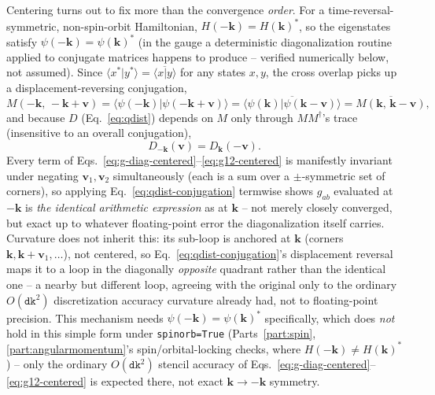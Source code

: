 \documentclass[11pt]{article}
\begin{document}
Centering turns out to fix more than the convergence \emph{order}. For a
time-reversal-symmetric, non-spin-orbit Hamiltonian, $H(-\mathbf k)=H(\mathbf k)^*$, so
the eigenstates satisfy $\psi(-\mathbf k) = \psi(\mathbf k)^*$ (in the gauge a
deterministic diagonalization routine applied to conjugate matrices happens to produce --
verified numerically below, not assumed). Since $\langle x^*|y^*\rangle =
\overline{\langle x|y\rangle}$ for any states $x,y$, the cross overlap picks up a
displacement-reversing conjugation,
\begin{equation}
  M(-\mathbf k,\, -\mathbf k+\mathbf v) = \langle\psi(-\mathbf k)|\psi(-\mathbf k+\mathbf v)\rangle
  = \overline{\langle\psi(\mathbf k)|\psi(\mathbf k-\mathbf v)\rangle}
  = \overline{M(\mathbf k,\,\mathbf k-\mathbf v)},
\end{equation}
and because $D$ (Eq.~\eqref{eq:qdist}) depends on $M$ only through $MM^\dagger$'s trace
(insensitive to an overall conjugation),
\begin{equation}
  D_{-\mathbf k}(\mathbf v) = D_{\mathbf k}(-\mathbf v).
  \label{eq:qdist-conjugation}
\end{equation}
Every term of Eqs.~\eqref{eq:g-diag-centered}--\eqref{eq:g12-centered} is manifestly
invariant under negating $\mathbf v_1,\mathbf v_2$ simultaneously (each is a sum over a
$\pm$-symmetric set of corners), so applying Eq.~\eqref{eq:qdist-conjugation} termwise
shows $g_{ab}$ evaluated at $-\mathbf k$ is \emph{the identical arithmetic expression} as
at $\mathbf k$ -- not merely closely converged, but exact up to whatever floating-point
error the diagonalization itself carries. Curvature does not inherit this: its sub-loop
is anchored at $\mathbf k$ (corners $\mathbf k,\mathbf k+\mathbf v_1,\dots$), not
centered, so Eq.~\eqref{eq:qdist-conjugation}'s displacement reversal maps it to a loop
in the diagonally \emph{opposite} quadrant rather than the identical one -- a nearby but
different loop, agreeing with the original only to the ordinary $O(\texttt{dk}^2)$
discretization accuracy curvature already had, not to floating-point precision. This
mechanism needs $\psi(-\mathbf k)=\psi(\mathbf k)^*$ specifically, which does \emph{not}
hold in this simple form under \texttt{spinorb=True} (Parts~\ref{part:spin},
\ref{part:angularmomentum}'s spin/orbital-locking checks, where $H(-\mathbf k)\ne H(\mathbf
k)^*$) -- only the ordinary $O(\texttt{dk}^2)$ stencil accuracy of
Eqs.~\eqref{eq:g-diag-centered}--\eqref{eq:g12-centered} is expected there, not exact
$\mathbf k\to-\mathbf k$ symmetry.
\end{document}
